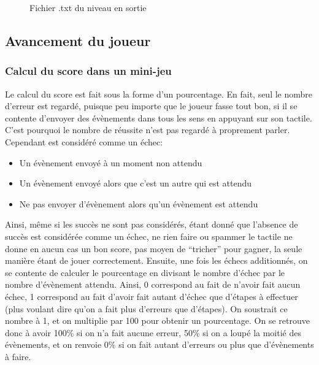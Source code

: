 \begin{figure}[H]\centering
  \caption{Fichier .txt du niveau en sortie}
  \label{level}
\end{figure}

\subsection{Avancement du joueur}

\subsubsection{Calcul du score dans un mini-jeu}

Le calcul du score est fait sous la forme d'un pourcentage. En fait, seul le nombre d'erreur est regardé, puisque peu importe que le joueur fasse tout bon, si il se contente d'envoyer des évènements dans tous les sens en appuyant sur son tactile. C'est pourquoi le nombre de réussite n'est pas regardé à proprement parler. Cependant est considéré comme un échec:
\begin{itemize}
\item Un évènement envoyé à un moment non attendu
\item Un évènement envoyé alors que c'est un autre qui est attendu
\item Ne pas envoyer d'évènement alors qu'un évènement est attendu
\end{itemize}
Ainsi, même si les succès ne sont pas considérés, étant donné que l'absence de succès est considérée comme un échec, ne rien faire ou spammer le tactile ne donne en aucun cas un bon score, pas moyen de “tricher” pour gagner, la seule manière étant de jouer correctement.
Ensuite, une fois les échecs additionnés, on se contente de calculer le pourcentage en divisant le nombre d'échec par le nombre d'évènement attendu. Ainsi, 0 correspond au fait de n'avoir fait aucun échec, 1 correspond au fait d'avoir fait autant d'échec que d'étapes à effectuer (plus voulant dire qu'on a fait plus d'erreurs que d'étapes). On soustrait ce nombre à 1, et on multiplie par 100 pour obtenir un pourcentage. On se retrouve donc à avoir 100\% si on n'a fait aucune erreur, 50\% si on a loupé la moitié des évènements, et on renvoie 0\% si on fait autant d'erreurs ou plus que d'évènements à faire. 

